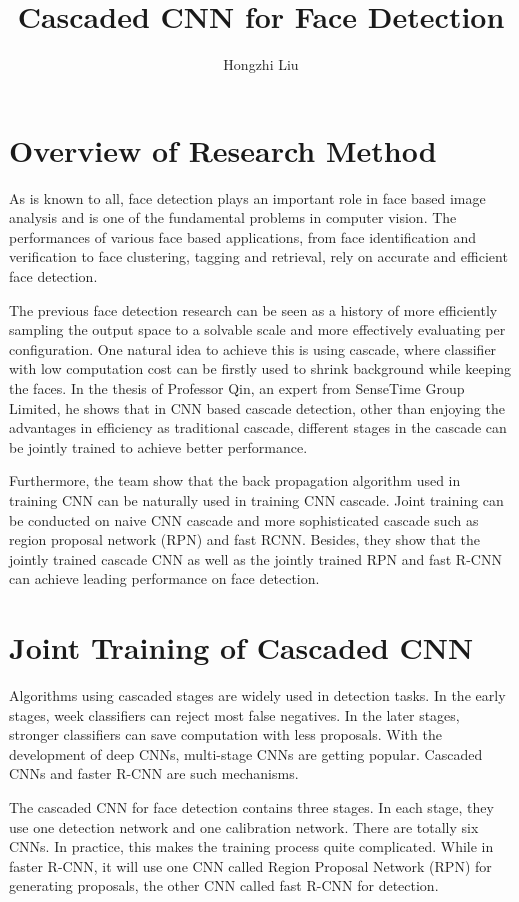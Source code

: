 \documentclass[twocolumn]{article}
\author{Hongzhi Liu}
\title{Cascaded CNN for Face Detection}
\begin{document}
	\maketitle
	\par
	\section{Overview of Research Method}
	As is known to all, face detection plays an important role in face based image analysis and is one of the fundamental problems in computer vision. The performances of various face based applications, from face identification and verification to face clustering, tagging and retrieval, rely on accurate and efficient face detection.
	
	The previous face detection research can be seen as a history of more efficiently sampling the output space to a solvable scale and more effectively evaluating per configuration. One natural idea to achieve this is using cascade, where classifier with low computation cost can be firstly used to shrink background while keeping the faces. In the thesis of Professor Qin, an expert from SenseTime Group Limited, he shows that in CNN based cascade detection, other than enjoying the advantages in efficiency as traditional cascade, different stages in the cascade can be jointly trained to achieve better performance\cite{Qin2016Joint}.
	
	Furthermore, the team show that the back propagation algorithm used in training CNN can be naturally used in training CNN cascade. Joint training can be conducted on naive CNN cascade and more sophisticated cascade such as region proposal network (RPN) and fast RCNN. Besides, they show that the jointly trained cascade CNN as well as the jointly trained RPN and fast R-CNN can achieve leading performance on face detection.
	
	\section{Joint Training of Cascaded CNN}	
	Algorithms using cascaded stages are widely used in detection tasks. In the early stages, week classifiers can reject most false negatives. In the later stages, stronger classifiers can save computation with less proposals. With the development of deep CNNs, multi-stage CNNs are getting popular. Cascaded CNNs\cite{Li2015A} and faster R-CNN\cite{Ren2017Faster} are such mechanisms.
	
	The cascaded CNN for face detection contains three stages. In each stage, they use one detection network and one calibration network. There are totally six CNNs. In practice, this makes the training process quite complicated. While in faster R-CNN, it will use one CNN called Region Proposal Network (RPN) for generating proposals, the other CNN called fast R-CNN for detection. 
	
\end{document}
